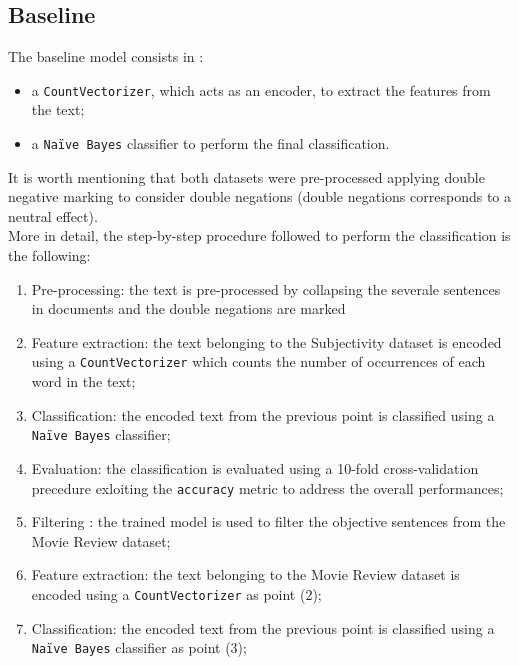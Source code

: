 \subsection{Baseline}
The baseline model consists in :
\begin{itemize}
    \item a \texttt{CountVectorizer}\cite{vectorizer}, which acts as an encoder, to extract the features from the text;
    \item a \texttt{Na\"{i}ve Bayes}\cite{naive} classifier to perform the final classification.
\end{itemize}
It is worth mentioning that both datasets were pre-processed applying double negative marking to consider double negations (double negations corresponds to a neutral effect).\\
More in detail, the step-by-step procedure followed to perform the classification is the following:
\begin{enumerate}
    \item Pre-processing: the text is pre-processed by collapsing the severale sentences in documents and the double negations are marked
    \item Feature extraction: the text belonging to the Subjectivity dataset is encoded using a \texttt{CountVectorizer} which counts the number of occurrences of each word in the text;
    \item Classification: the encoded text from the previous point is classified using a \texttt{Na\"{i}ve Bayes} classifier;
    \item Evaluation: the classification is evaluated using a 10-fold cross-validation precedure exloiting the \texttt{accuracy} metric to address the overall performances;
    \item Filtering : the trained model is used to filter the objective sentences from the Movie Review dataset;    
    \item Feature extraction: the text belonging to the Movie Review dataset is encoded using a \texttt{CountVectorizer} as point (2);
    \item Classification: the encoded text from the previous point is classified using a \texttt{Na\"{i}ve Bayes} classifier as point (3);
\end{enumerate}
